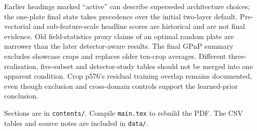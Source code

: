 Earlier headings marked ``active'' can describe superseded architecture choices; the one-plate final state takes precedence over the initial two-layer default. Pre-vectorial and sub-feature-scale headline scores are historical and are not final evidence. Old field-statistics proxy claims of an optimal random plate are narrower than the later detector-aware results. The final GPnP summary excludes showcase crops and replaces older ten-crop averages. Different three-realisation, five-subset and detector-study tables should not be merged into one apparent condition. Crop p576's residual training overlap remains documented, even though exclusion and cross-domain controls support the learned-prior conclusion.

Sections are in \texttt{contents/}. Compile \texttt{main.tex} to rebuild the PDF. The CSV tables and source notes are included in \texttt{data/}.
